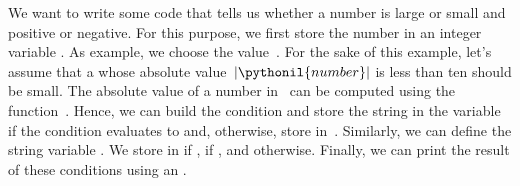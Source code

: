 We want to write some code that tells us whether a number is large or small and positive or negative.
For this purpose, we first store the number in an integer variable .
As example, we choose the value~.
For the sake of this example, let's assume that a  whose absolute value~$|\pythonil{number}|$ is less than ten should be small.
The absolute value of a number in \python\ can be computed using the function~.
Hence, we can build the condition  and store the string  in the variable  if the condition evaluates to  and, otherwise, store  in~.
Similarly, we can define the string variable .
We store  in  if ,  if , and  otherwise.
Finally, we can print the result of these conditions using an .

